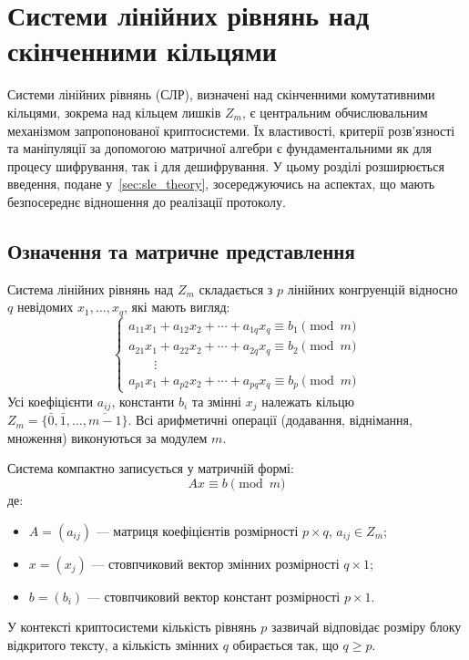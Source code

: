 \section{Системи лінійних рівнянь над скінченними кільцями}
\label{sec:sle_over_rings}
Системи лінійних рівнянь (СЛР), визначені над скінченними комутативними кільцями, зокрема над кільцем лишків $Z_m$, є центральним обчислювальним механізмом запропонованої криптосистеми.
Їх властивості, критерії розв'язності та маніпуляції за допомогою матричної алгебри є фундаментальними як для процесу шифрування, так і для дешифрування.
У цьому розділі розширюється введення, подане у~\ref{sec:sle_theory}, зосереджуючись на аспектах, що мають безпосереднє відношення до реалізації протоколу.

\subsection{Означення та матричне представлення}
\label{subsec:sle_definition_rings}
Система лінійних рівнянь над $Z_m$ складається з $p$ лінійних конгруенцій відносно $q$ невідомих $x_1, \ldots, x_q$, які мають вигляд:
\[
    \begin{cases}
        a_{11}x_1 + a_{12}x_2 + \cdots + a_{1q}x_q \equiv b_1 \pmod{m} \\
        a_{21}x_1 + a_{22}x_2 + \cdots + a_{2q}x_q \equiv b_2 \pmod{m} \\
        \qquad \vdots \\
        a_{p1}x_1 + a_{p2}x_2 + \cdots + a_{pq}x_q \equiv b_p \pmod{m}
    \end{cases}
\]
Усі коефіцієнти $a_{ij}$, константи $b_i$ та змінні $x_j$ належать кільцю $Z_m = \{\bar{0}, \bar{1}, \ldots, \overline{m-1}\}$.
Всі арифметичні операції (додавання, віднімання, множення) виконуються за модулем $m$.

Система компактно записується у матричній формі:
\[
    Ax \equiv b \pmod{m}
\]
де:
\begin{itemize}
    \item $A = (a_{ij})$ — матриця коефіцієнтів розмірності $p \times q$, $a_{ij} \in Z_m$;
    \item $x = (x_j)$ — стовпчиковий вектор змінних розмірності $q \times 1$;
    \item $b = (b_i)$ — стовпчиковий вектор констант розмірності $p \times 1$.
\end{itemize}
У контексті криптосистеми кількість рівнянь $p$ зазвичай відповідає розміру блоку відкритого тексту, а кількість змінних $q$ обирається так, що $q \geq p$.

